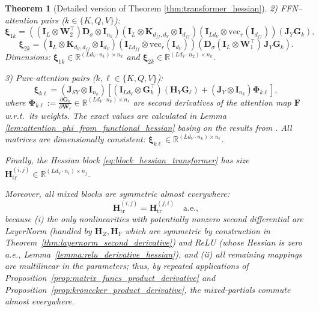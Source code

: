 \documentclass{article}
\newtheorem{theorem}{Theorem} %
\begin{document}
\begin{theorem}[Detailed version of Theorem \ref{thm:transformer_hessian}]
2) FFN–attention pairs ($k \in \{K,Q,V\}$):
\[
\boldsymbol{\xi}_{1k} 
= \left( (\mathbf{I}_L \otimes \mathbf{W}_2^\top) \mathbf{D}_\sigma \otimes \mathbf{I}_{n_k}\right)
\left( \mathbf{I}_L \otimes \mathbf{K}_{d_{ff}, d_V} \otimes \mathbf{I}_{d_{ff}} \right)
\left( \mathbf{I}_{L d_V} \otimes \mathrm{vec}_r(\mathbf{I}_{d_{ff}}) \right) \left( \mathbf{J}_Y \mathbf{G}_k \right),
\]
\[\boldsymbol{\xi}_{2k} = \left( \mathbf{I}_L \otimes \mathbf{K}_{d_V, d_{ff}} \otimes \mathbf{I}_{d_V} \right)\left( \mathbf{I}_{L d_{ff}} \otimes \mathrm{vec}_r(\mathbf{I}_{d_V}) \right)\left( \mathbf{D}_\sigma (\mathbf{I}_L \otimes \mathbf{W}_1^\top) \, \mathbf{J}_Y \mathbf{G}_k \right).\]
Dimensions: $\boldsymbol{\xi}_{1k} \in \mathbb{R}^{(L d_V \cdot n_1) \times n_k}$ and $\boldsymbol{\xi}_{2k} \in \mathbb{R}^{(L d_V \cdot n_2) \times n_k}$.

3) Pure-attention pairs ($k,\ell \in \{K,Q,V\}$):
\[
\boldsymbol{\xi}_{k\ell} 
= \left( \mathbf{J}_{SY} \otimes \mathbf{I}_{n_k} \right)
\left[\left( \mathbf{I}_{L d_V} \otimes \mathbf{G}_k^\top \right) \left( \mathbf{H}_Y \mathbf{G}_\ell \right)+ \left( \mathbf{J}_Y \otimes \mathbf{I}_{n_k} \right) \boldsymbol{\Phi}_{k\ell}\right],
\]
where $\boldsymbol{\Phi}_{k\ell} := \frac{\partial \mathbf{G}_k}{\partial \mathbf{W}_\ell} \in \mathbb{R}^{(L d_V \cdot n_k) \times n_\ell}$ are second derivatives of the attention map $\mathbf{F}$ w.r.t.\ its weights. The exact values are calculated in Lemma \ref{lem:attention_phi_from_functional_hessian} basing on the results from \cite{ormaniec2024attentionhessian}. All matrices are dimensionally consistent:
$\boldsymbol{\xi}_{k\ell} \in \mathbb{R}^{(L d_V \cdot n_k) \times n_\ell}$.

Finally, the Hessian block \eqref{eq:block_hessian_transformer} has size 
$\mathbf{H}_{\mathrm{tr}}^{(i,j)} \in \mathbb{R}^{(L d_V \cdot n_i) \times n_j}$.

Moreover, all mixed blocks are symmetric almost everywhere:
\[
\mathbf{H}_{\mathrm{tr}}^{(i,j)} = \mathbf{H}_{\mathrm{tr}}^{(j,i)} \quad \text{a.e.},
\]
because (i) the only nonlinearities with potentially nonzero second differential are LayerNorm (handled by $\mathbf{H}_Z,\mathbf{H}_Y$ which are symmetric by construction in Theorem~\ref{thm:layernorm_second_derivative}) and ReLU (whose Hessian is zero a.e., Lemma~\ref{lemma:relu_derivative_hessian}), and (ii) all remaining mappings are multilinear in the parameters; thus, by repeated applications of Proposition~\ref{prop:matrix_funcs_product_derivative} and Proposition~\ref{prop:kronecker_product_derivative}, the mixed-partials commute almost everywhere.
\end{theorem}
\end{document}
